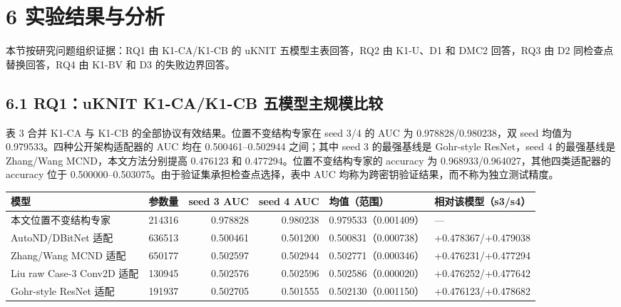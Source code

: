 \documentclass{templates/cjc-utf8}
\def\endhead{}
\newcommand{\papertabletitle}{}
\newcommand{\papertablecaption}[1]{\gdef\papertabletitle{#1}}
\begin{document}
\hypertarget{ux5b9eux9a8cux7ed3ux679cux4e0eux5206ux6790}{%
\section{6
实验结果与分析}\label{ux5b9eux9a8cux7ed3ux679cux4e0eux5206ux6790}}

本节按研究问题组织证据：RQ1 由 K1-CA/K1-CB 的 uKNIT
五模型主表回答，RQ2 由 K1-U、D1 和 DMC2 回答，RQ3 由 D2
同检查点替换回答，RQ4 由 K1-BV 和 D3 的失败边界回答。

\subsection{6.1 RQ1：uKNIT K1-CA/K1-CB 五模型主规模比较}

表 3 合并 K1-CA 与 K1-CB
的全部协议有效结果。位置不变结构专家在 seed 3/4 的 AUC 为
0.978828/0.980238，双 seed 均值为 0.979533。四种公开架构适配器的 AUC
均在 0.500461--0.502944 之间；其中 seed 3 的最强基线是 Gohr-style
ResNet，seed 4 的最强基线是 Zhang/Wang MCND，本文方法分别提高
0.476123 和 0.477294。位置不变结构专家的 accuracy 为
0.968933/0.964027，其他四类适配器的 accuracy 位于
0.500000--0.503075。由于验证集承担检查点选择，表中 AUC
均称为跨密钥验证结果，而不称为独立测试精度。

\papertablecaption{uKNIT-BC r5 在 262144/class 冻结项目协议下的五模型比较}

\begingroup
\scriptsize
\setlength{\tabcolsep}{2.2pt}
\begin{longtable}[]{@{}p{}rrrp{}p{}@{}}
\toprule
模型 & 参数量 & seed 3 AUC & seed 4 AUC & 均值（范围） &
相对该模型（s3/s4）\tabularnewline
\midrule
\endhead
本文位置不变结构专家 & 214316 & 0.978828 & 0.980238 &
0.979533\newline（0.001409） & ---\tabularnewline
AutoND/DBitNet 适配 & 636513 & 0.500461 & 0.501200 &
0.500831\newline（0.000738） & +0.478367/\newline +0.479038\tabularnewline
Zhang/Wang MCND 适配 & 650177 & 0.502597 & 0.502944 &
0.502771\newline（0.000346） & +0.476231/\newline +0.477294\tabularnewline
Liu raw Case-3 Conv2D 适配 & 130945 & 0.502576 & 0.502596 &
0.502586\newline（0.000020） & +0.476252/\newline +0.477642\tabularnewline
Gohr-style ResNet 适配 & 191937 & 0.502705 & 0.501555 &
0.502130\newline（0.001150） & +0.476123/\newline +0.478682\tabularnewline
\bottomrule
\end{longtable}
\endgroup
\end{document}
